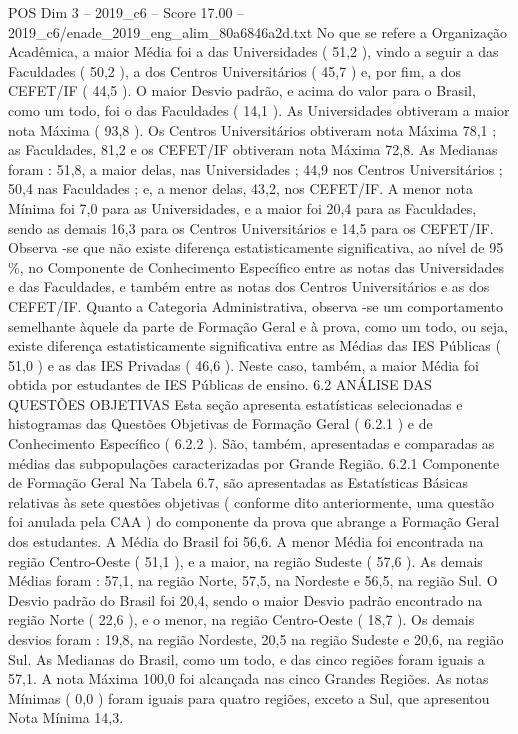 \begin{textsample}{POS Dim 3 – 2019\_c6 – Score 17.00 – 2019\_c6/enade\_2019\_eng\_alim\_80a6846a2d.txt}
No que se refere a Organização Acadêmica, a maior Média foi a das Universidades ( 51,2 ), vindo a seguir a das Faculdades ( 50,2 ), a dos Centros Universitários ( 45,7 ) e, por fim, a dos CEFET/IF ( 44,5 ).
O maior Desvio padrão, e acima do valor para o Brasil, como um todo, foi o das Faculdades ( 14,1 ).
As Universidades obtiveram a maior nota Máxima ( 93,8 ).
Os Centros Universitários obtiveram nota Máxima 78,1 ; as Faculdades, 81,2 e os CEFET/IF obtiveram nota Máxima 72,8.
As Medianas foram : 51,8, a maior delas, nas Universidades ; 44,9 nos Centros Universitários ; 50,4 nas Faculdades ; e, a menor delas, 43,2, nos CEFET/IF.
A menor nota Mínima foi 7,0 para as Universidades, e a maior foi 20,4 para as Faculdades, sendo as demais 16,3 para os Centros Universitários e 14,5 para os CEFET/IF.
Observa -se que não existe diferença estatisticamente significativa, ao nível de 95 \%, no Componente de Conhecimento Específico entre as notas das Universidades e das Faculdades, e também entre as notas dos Centros Universitários e as dos CEFET/IF.
Quanto a Categoria Administrativa, observa -se um comportamento semelhante àquele da parte de Formação Geral e à prova, como um todo, ou seja, existe diferença estatisticamente significativa entre as Médias das IES Públicas ( 51,0 ) e as das IES Privadas ( 46,6 ).
Neste caso, também, a maior Média foi obtida por estudantes de IES Públicas de ensino. 6.2 ANÁLISE DAS QUESTÕES OBJETIVAS Esta seção apresenta estatísticas selecionadas e histogramas das Questões Objetivas de Formação Geral ( 6.2.1 ) e de Conhecimento Específico ( 6.2.2 ).
São, também, apresentadas e comparadas as médias das subpopulações caracterizadas por Grande Região. 6.2.1 Componente de Formação Geral Na Tabela 6.7, são apresentadas as Estatísticas Básicas relativas às sete questões objetivas ( conforme dito anteriormente, uma questão foi anulada pela CAA ) do componente da prova que abrange a Formação Geral dos estudantes.
A Média do Brasil foi 56,6.
A menor Média foi encontrada na região Centro-Oeste ( 51,1 ), e a maior, na região Sudeste ( 57,6 ).
As demais Médias foram : 57,1, na região Norte, 57,5, na Nordeste e 56,5, na região Sul.
O Desvio padrão do Brasil foi 20,4, sendo o maior Desvio padrão encontrado na região Norte ( 22,6 ), e o menor, na região Centro-Oeste ( 18,7 ).
Os demais desvios foram : 19,8, na região Nordeste, 20,5 na região Sudeste e 20,6, na região Sul.
As Medianas do Brasil, como um todo, e das cinco regiões foram iguais a 57,1.
A nota Máxima 100,0 foi alcançada nas cinco Grandes Regiões.
As notas Mínimas ( 0,0 ) foram iguais para quatro regiões, exceto a Sul, que apresentou Nota Mínima 14,3.

\end{textsample}
